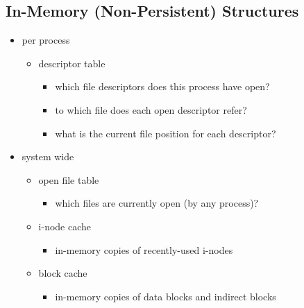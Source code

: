 \documentclass[12pt]{article}
\theoremstyle{plain}
\theoremstyle{definition}
\begin{document}
\subsection{In-Memory (Non-Persistent) Structures}
\begin{itemize}
  \item per process
  \begin{itemize}
    \item descriptor table
    \begin{itemize}
      \item which file descriptors does this process have open?
      \item to which file does each open descriptor refer?
      \item what is the current file position for each descriptor?
    \end{itemize}
  \end{itemize}

  \item system wide
  \begin{itemize}
    \item open file table
    \begin{itemize}
      \item which files are currently open (by any process)?
    \end{itemize}
    \item i-node cache
    \begin{itemize}
      \item in-memory copies of recently-used i-nodes
    \end{itemize}
    \item block cache
    \begin{itemize}
      \item in-memory copies of data blocks and indirect blocks
    \end{itemize}
  \end{itemize}
\end{itemize}
\end{document}

